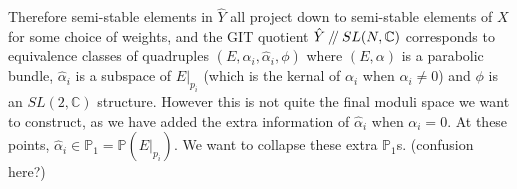 \documentclass[]{article}
\newcommand{\C}{\mathbb{C}}
\newcommand{\PP}{\mathbb{P}}
\newcommand{\sslash}{\mathbin{/\mkern-4mu/}}
\begin{document}
Therefore semi-stable elements in $\hat{Y}$ all project down to semi-stable elements of $X$ for some choice of weights, and the GIT quotient $\hat{Y}\sslash SL(N,\C)$ corresponds to equivalence classes of quadruples $(E,\alpha_i, \hat{\alpha}_i, \phi)$ where $(E,\alpha)$ is a parabolic bundle, $\hat{\alpha}_i$ is a subspace of $E|_{p_i}$ (which is the kernal of $\alpha_i$ when $\alpha_i \neq 0$) and $\phi$ is an $SL(2,\C)$ structure. However this is not quite the final moduli space we want to construct, as we have added the extra information of $\hat{\alpha}_i$ when $\alpha_i = 0$. At these points, $\hat{\alpha}_i \in \PP_1=\PP(E|_{p_i})$. We want to collapse these extra $\PP_1$s. (confusion here?) 

	
\end{document}
